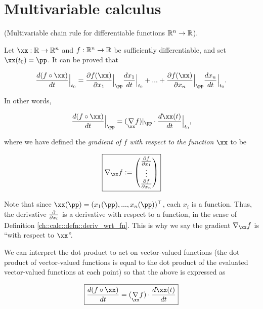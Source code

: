 \newpage

\section{Multivariable calculus}

\begin{lemma}
    (Multivariable chain rule for differentiable functions $\mathbb{R}^n \rightarrow \mathbb{R}$).
    
    Let $\xx:\R \rightarrow \R^n$ and $f:\mathbb{R}^n \rightarrow \mathbb{R}$ be sufficiently differentiable, and set $\xx(t_0) = \pp$. It can be proved that %

    \begin{align*}
        \frac{d (f \circ \xx)}{dt}\Big|_{t_0} = \frac{\pd f(\xx)}{\pd x_1}\Big|_\pp \frac{dx_1}{dt}\Big|_{t_0} + ... + \frac{\pd f(\xx)}{\pd x_n}\Big|_\pp \frac{dx_n}{dt}\Big|_{t_0}.
    \end{align*}
    
    In other words, 
    
    \begin{align*}
        \frac{d (f \circ \xx)}{dt}\Big|_\pp =
        (\underset{\xx}{\nabla} f)|_\pp \cdot \frac{d\xx(t)}{dt}\Big|_{t_0},
    \end{align*}
    
    where we have defined the \textit{gradient of $f$ with respect to the function $\xx$} to be
    
    \begin{align*}
        \boxed
        {
            \nabla_\xx f := 
            \begin{pmatrix} \frac{\pd f}{\pd x_1} \\ \vdots \\ \frac{\pd f}{\pd x_n} \end{pmatrix}
        }
    \end{align*}
    
    Note that since $\xx(\pp) = (x_1(\pp), ..., x_n(\pp))^\top$, each $x_i$ is a function. Thus, the derivative $\frac{\partial}{\partial x_i}$ is a derivative with respect to a function, in the sense of Definition \ref{ch::calc::defn::deriv_wrt_fn}. This is why we say the gradient $\nabla_\xx f$ is ``with respect to $\xx$''.
    
    We can interpret the dot product to act on vector-valued functions (the dot product of vector-valued functions is equal to the dot product of the evaluated vector-valued functions at each point) so that the above is expressed as
    
    \begin{align*}
        \boxed
        {
            \frac{d (f \circ \xx)}{dt} =
            (\underset{\xx}{\nabla} f) \cdot \frac{d\xx(t)}{dt}
        }
    \end{align*}
\end{lemma}


